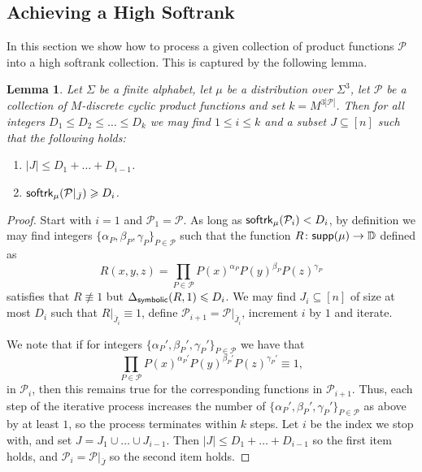 \documentclass[10pt,a4paper]{amsart}
\newtheorem{lemma}[thm]{Lemma}
\newcommand\card[1]{\left| {#1} \right|}
\renewcommand\geq{\geqslant}
\renewcommand\leq{\leqslant}
\begin{document}
    \subsection{Achieving a High Softrank}\label{sec:high_softrank}
    In this section we show how to process a given collection of product functions $\mathcal{P}$ into a high softrank collection. This is captured by the following lemma.
    \begin{lemma}\label{lem:softrank_gain}
        Let $\Sigma$ be a finite alphabet, let $\mu$ be a distribution over $\Sigma^3$, let $\mathcal{P}$ be a collection of $M$-discrete cyclic product functions and set $k = M^{3\card{\mathcal{P}}}$. Then for all integers $D_1\leq D_2\leq\ldots\leq D_k$ we may find $1\leq i\leq k$ and a subset $J\subseteq [n]$ such that the following holds:
        \begin{enumerate}
            \item $\card{J}\leq D_1+\ldots+D_{i-1}$.
            \item ${\sf softrk}_{\mu}(\mathcal{P}|_{\bar{J}})\geq D_{i}$.
        \end{enumerate}
    \end{lemma}
    \begin{proof}
        Start with $i=1$ and $\mathcal{P}_1 = \mathcal{P}$. As long as ${\sf softrk}_{\mu}(\mathcal{P}_i)<D_i$, by definition we may find integers $\{\alpha_P,\beta_{P},\gamma_{P}\}_{P\in\mathcal{P}}$ such that the function 
        $R\colon {\sf supp}(\mu)\to\mathbb{D}$ defined as
        \[
        R(x,y,z) = \prod\limits_{P\in\mathcal{P}}P(x)^{\alpha_P}P(y)^{\beta_P}P(z)^{\gamma_P}
        \] 
        satisfies that $R\not\equiv 1$ but $\Delta_{{\sf symbolic}}(R,1)\leq D_i$. We may find $J_i\subseteq [n]$ of size at most $D_i$ such that $R|_{\bar{J}_i}\equiv 1$, define $\mathcal{P}_{i+1} = \mathcal{P}|_{\bar{J}_i}$, increment $i$ by $1$ and iterate. 

        We note that if for integers $\{\alpha_P',\beta_{P}',\gamma_{P}'\}_{P\in\mathcal{P}}$ we have that
        \[
        \prod\limits_{P\in\mathcal{P}}P(x)^{\alpha_P'}P(y)^{\beta_P'}P(z)^{\gamma_P'}\equiv 1,
        \]
        in $\mathcal{P}_i$, then this remains true for the corresponding functions in $\mathcal{P}_{i+1}$. Thus, each step of the iterative process increases the number of $\{\alpha_P',\beta_{P}',\gamma_{P}'\}_{P\in\mathcal{P}}$ as above by at least $1$, so the process terminates within $k$ steps. Let $i$ be the index we stop with, and set $J = J_1\cup\ldots \cup J_{i-1}$. Then $\card{J}\leq D_1+\ldots+D_{i-1}$ so the first item holds, and $\mathcal{P}_i = \mathcal{P}|_{\bar{J}}$ so the second item holds.
    \end{proof}
\end{document}
